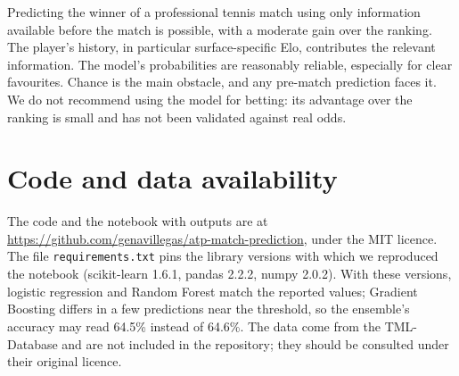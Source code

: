 \documentclass[11pt,a4paper]{article}
\begin{document}
Predicting the winner of a professional tennis match using only information available before the match is possible, with a moderate gain over the ranking. The player's history, in particular surface-specific Elo, contributes the relevant information. The model's probabilities are reasonably reliable, especially for clear favourites. Chance is the main obstacle, and any pre-match prediction faces it. We do not recommend using the model for betting: its advantage over the ranking is small and has not been validated against real odds.

\section*{Code and data availability}

The code and the notebook with outputs are at \url{https://github.com/genavillegas/atp-match-prediction}, under the MIT licence. The file \texttt{requirements.txt} pins the library versions with which we reproduced the notebook (scikit-learn 1.6.1, pandas 2.2.2, numpy 2.0.2). With these versions, logistic regression and Random Forest match the reported values; Gradient Boosting differs in a few predictions near the threshold, so the ensemble's accuracy may read 64.5\% instead of 64.6\%. The data come from the TML-Database \cite{tml2026} and are not included in the repository; they should be consulted under their original licence.



\end{document}
